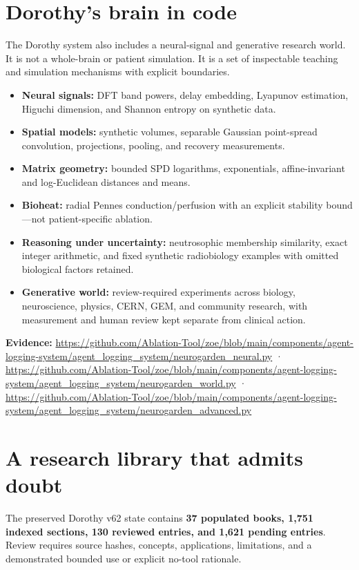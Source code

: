 \documentclass[11pt]{article}
\newcommand{\evidence}[1]{\par\smallskip\small\color{ZoeGray}\textbf{Evidence:} #1\normalsize\par\smallskip}
\begin{document}
\clearpage
\section{Dorothy's brain in code}

The Dorothy system also includes a neural-signal and generative research world. It is not a whole-brain or patient simulation. It is a set of inspectable teaching and simulation mechanisms with explicit boundaries.

\begin{itemize}
  \item \textbf{Neural signals:} DFT band powers, delay embedding, Lyapunov estimation, Higuchi dimension, and Shannon entropy on synthetic data.
  \item \textbf{Spatial models:} synthetic volumes, separable Gaussian point-spread convolution, projections, pooling, and recovery measurements.
  \item \textbf{Matrix geometry:} bounded SPD logarithms, exponentials, affine-invariant and log-Euclidean distances and means.
  \item \textbf{Bioheat:} radial Pennes conduction/perfusion with an explicit stability bound—not patient-specific ablation.
  \item \textbf{Reasoning under uncertainty:} neutrosophic membership similarity, exact integer arithmetic, and fixed synthetic radiobiology examples with omitted biological factors retained.
  \item \textbf{Generative world:} review-required experiments across biology, neuroscience, physics, CERN, GEM, and community research, with measurement and human review kept separate from clinical action.
\end{itemize}

\evidence{\url{https://github.com/Ablation-Tool/zoe/blob/main/components/agent-logging-system/agent_logging_system/neurogarden_neural.py} · \url{https://github.com/Ablation-Tool/zoe/blob/main/components/agent-logging-system/agent_logging_system/neurogarden_world.py} · \url{https://github.com/Ablation-Tool/zoe/blob/main/components/agent-logging-system/agent_logging_system/neurogarden_advanced.py}}

\clearpage
\section{A research library that admits doubt}

The preserved Dorothy v62 state contains \textbf{37 populated books, 1,751 indexed sections, 130 reviewed entries, and 1,621 pending entries}. Review requires source hashes, concepts, applications, limitations, and a demonstrated bounded use or explicit no-tool rationale.
\end{document}
